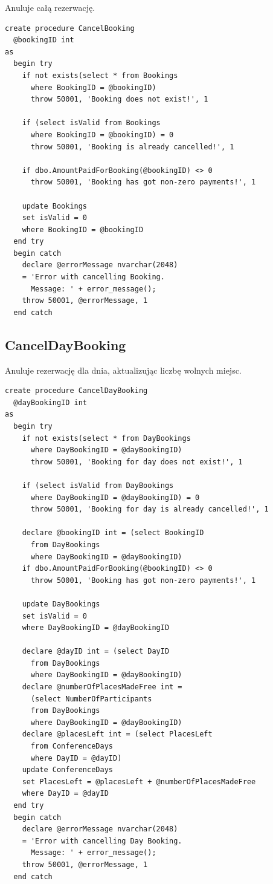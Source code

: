 \documentclass[12pt, a4paper]{mwrep}
\begin{document}
\noindent Anuluje całą rezerwację.

\begin{lstlisting}
create procedure CancelBooking
  @bookingID int
as
  begin try
    if not exists(select * from Bookings 
      where BookingID = @bookingID)
      throw 50001, 'Booking does not exist!', 1

    if (select isValid from Bookings 
      where BookingID = @bookingID) = 0
      throw 50001, 'Booking is already cancelled!', 1

    if dbo.AmountPaidForBooking(@bookingID) <> 0
      throw 50001, 'Booking has got non-zero payments!', 1

    update Bookings
    set isValid = 0
    where BookingID = @bookingID
  end try
  begin catch
    declare @errorMessage nvarchar(2048)
    = 'Error with cancelling Booking. 
      Message: ' + error_message();
    throw 50001, @errorMessage, 1
  end catch
\end{lstlisting}

\subsection{CancelDayBooking}

\noindent Anuluje rezerwację dla dnia, aktualizując liczbę wolnych miejsc.

\begin{lstlisting}
create procedure CancelDayBooking
  @dayBookingID int
as
  begin try
    if not exists(select * from DayBookings 
      where DayBookingID = @dayBookingID)
      throw 50001, 'Booking for day does not exist!', 1

    if (select isValid from DayBookings 
      where DayBookingID = @dayBookingID) = 0
      throw 50001, 'Booking for day is already cancelled!', 1

    declare @bookingID int = (select BookingID 
      from DayBookings 
      where DayBookingID = @dayBookingID)
    if dbo.AmountPaidForBooking(@bookingID) <> 0
      throw 50001, 'Booking has got non-zero payments!', 1

    update DayBookings
    set isValid = 0
    where DayBookingID = @dayBookingID

    declare @dayID int = (select DayID 
      from DayBookings 
      where DayBookingID = @dayBookingID)
    declare @numberOfPlacesMadeFree int = 
      (select NumberOfParticipants 
      from DayBookings 
      where DayBookingID = @dayBookingID)
    declare @placesLeft int = (select PlacesLeft
      from ConferenceDays 
      where DayID = @dayID)
    update ConferenceDays
    set PlacesLeft = @placesLeft + @numberOfPlacesMadeFree
    where DayID = @dayID
  end try
  begin catch
    declare @errorMessage nvarchar(2048)
    = 'Error with cancelling Day Booking. 
      Message: ' + error_message();
    throw 50001, @errorMessage, 1
  end catch
\end{lstlisting}
\end{document}
